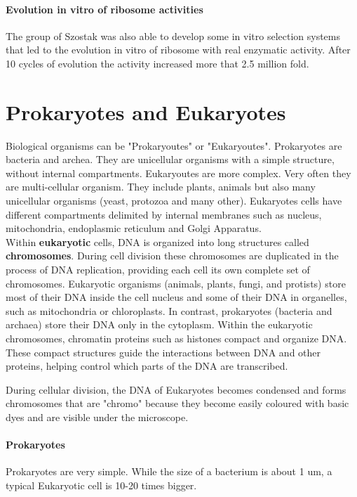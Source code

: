 \paragraph*{Evolution in vitro of ribosome activities}
The group of Szostak was also able to develop some in vitro selection systems
that led to the evolution in vitro of ribosome with real enzymatic activity.
After 10 cycles of evolution the activity increased more that 2.5 million fold.

\section{Prokaryotes and Eukaryotes}

Biological organisms can be "Prokaryoutes" or "Eukaryoutes". Prokaryotes are
bacteria and archea. They are unicellular organisms with a simple structure,
without internal compartments. Eukaryoutes are more complex. Very often they are
multi-cellular organism. They include plants, animals but also many unicellular
organisms (yeast, protozoa and many other). Eukaryotes cells have different
compartments delimited by internal membranes such as nucleus, mitochondria,
endoplasmic reticulum and Golgi Apparatus.\\

Within \textbf{eukaryotic} cells, DNA is organized into long structures called
\textbf{chromosomes}.
During cell division these chromosomes are duplicated in the process of DNA
replication, providing each cell its own complete set of chromosomes.
Eukaryotic organisms (animals, plants, fungi, and protists) store most of
their DNA inside the cell nucleus and some of their DNA in organelles, such as
mitochondria or chloroplasts.
In contrast, prokaryotes (bacteria and archaea) store their DNA only in the
cytoplasm.
Within the eukaryotic chromosomes, chromatin proteins such as histones compact
and organize DNA.
These compact structures guide the interactions between DNA and other proteins,
helping control which parts of the DNA are transcribed.

During cellular division, the DNA
of Eukaryotes becomes condensed and forms chromosomes that are "chromo" because
they become easily coloured with basic dyes and are visible under the
microscope.

\paragraph*{Prokaryotes} Prokaryotes are very simple. While the size of a
bacterium is about 1 um, a typical Eukaryotic cell is 10-20 times bigger.

